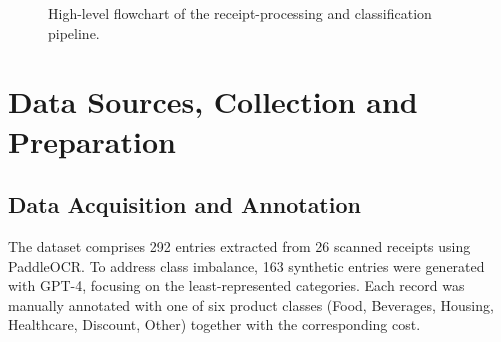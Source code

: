 \documentclass{SGGW-thesis-EN}
\begin{document}
\begin{figure}[h]
  \centering
  \caption{High-level flowchart of the receipt-processing and classification pipeline.}
  \label{fig:pipeline_flowchart_vertical}
\end{figure}



\section{Data Sources, Collection and Preparation}

\subsection{Data Acquisition and Annotation}
The dataset comprises 292 entries extracted from 26 scanned receipts using PaddleOCR.
To address class imbalance, 163 synthetic entries were generated with GPT-4, focusing on the least-represented categories. 
Each record was manually annotated with one of six product classes (Food, Beverages, Housing, Healthcare, Discount, Other) together
with the corresponding cost.
\end{document}
